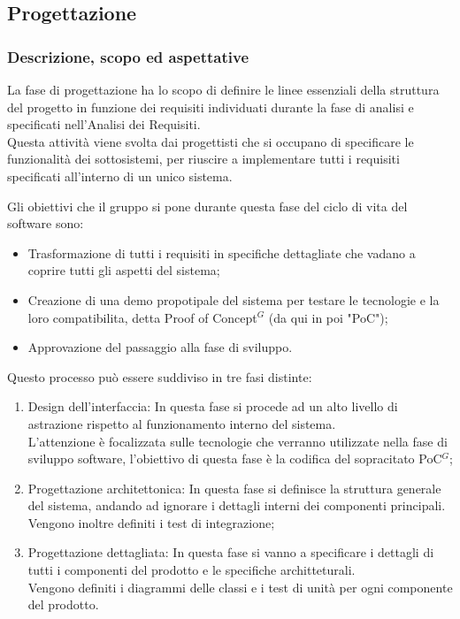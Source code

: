 \subsection{Progettazione}

\subsubsection{Descrizione, scopo ed aspettative}
La fase di progettazione ha lo scopo di definire le linee essenziali della struttura del progetto in funzione dei requisiti individuati durante la fase di analisi e specificati nell’Analisi dei Requisiti. \\
Questa attività viene svolta dai progettisti che si occupano di specificare le funzionalità dei sottosistemi, per riuscire a implementare tutti i requisiti specificati all'interno di un unico sistema.

Gli obiettivi che il gruppo si pone durante questa fase del ciclo di vita del software sono:
\begin{itemize}
    \item Trasformazione di tutti i requisiti in specifiche dettagliate che vadano a coprire tutti gli aspetti del sistema;
    \item Creazione di una demo propotipale del sistema per testare le tecnologie e la loro compatibilita, detta Proof of Concept$^{G}$ (da qui in poi "PoC");
    \item Approvazione del passaggio alla fase di sviluppo.
\end{itemize}

Questo processo può essere suddiviso in tre fasi distinte:
\begin{enumerate}
    \item Design dell'interfaccia: In questa fase si procede ad un alto livello di astrazione rispetto al funzionamento interno del sistema.\\ L'attenzione è focalizzata sulle tecnologie che verranno utilizzate nella fase di sviluppo software, l'obiettivo di questa fase è la codifica del sopracitato PoC$^{G}$;
    \item Progettazione architettonica: In questa fase si definisce la struttura generale del sistema, andando ad ignorare i dettagli interni dei componenti principali. \\ Vengono inoltre definiti i test di integrazione;
    \item Progettazione dettagliata: In questa fase si vanno a specificare i dettagli di tutti i componenti del prodotto e le specifiche architteturali. \\ Vengono definiti i diagrammi delle classi e i test di unità per ogni componente del prodotto.
\end{enumerate}
